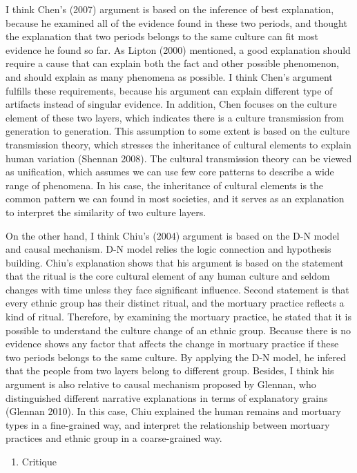 \documentclass[10pt]{article}
\begin{document}
I think Chen's (2007) argument is based on the inference of best
explanation, because he examined all of the evidence found in these two
periods, and thought the explanation that two periods belongs to the
same culture can fit most evidence he found so far. As Lipton (2000)
mentioned, a good explanation should require a cause that can explain
both the fact and other possible phenomenon, and should explain as many
phenomena as possible. I think Chen's argument fulfills these
requirements, because his argument can explain different type of
artifacts instead of singular evidence. In addition, Chen focuses on the
culture element of these two layers, which indicates there is a culture
transmission from generation to generation. This assumption to some
extent is based on the culture transmission theory, which stresses the
inheritance of cultural elements to explain human variation (Shennan
2008). The cultural transmission theory can be viewed as unification,
which assumes we can use few core patterns to describe a wide range of
phenomena. In his case, the inheritance of cultural elements is the
common pattern we can found in most societies, and it serves as an
explanation to interpret the similarity of two culture layers.

On the other hand, I think Chiu's (2004) argument is based on the D-N
model and causal mechanism. D-N model relies the logic connection and
hypothesis building. Chiu's explanation shows that his argument is based
on the statement that the ritual is the core cultural element of any
human culture and seldom changes with time unless they face significant
influence. Second statement is that every ethnic group has their
distinct ritual, and the mortuary practice reflects a kind of ritual.
Therefore, by examining the mortuary practice, he stated that it is
possible to understand the culture change of an ethnic group. Because
there is no evidence shows any factor that affects the change in
mortuary practice if these two periods belongs to the same culture. By
applying the D-N model, he infered that the people from two layers
belong to different group. Besides, I think his argument is also
relative to causal mechanism proposed by Glennan, who distinguished
different narrative explanations in terms of explanatory grains (Glennan
2010). In this case, Chiu explained the human remains and mortuary types
in a fine-grained way, and interpret the relationship between mortuary
practices and ethnic group in a coarse-grained way.

\begin{enumerate}
\def\labelenumi{\arabic{enumi}.}
\setcounter{enumi}{2}
\itemsep1pt\parskip0pt
\item
  Critique
\end{enumerate}
\end{document}
